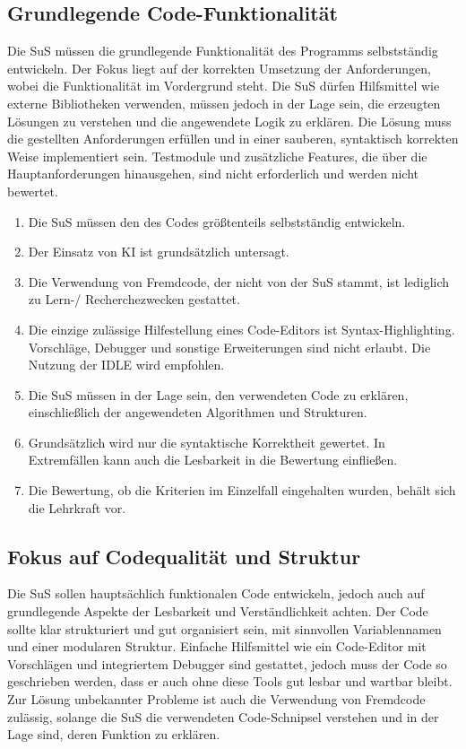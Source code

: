 \documentclass[a4paper,12pt]{article}
\begin{document}
\subsection{Grundlegende Code-Funktionalität}
Die SuS müssen die grundlegende Funktionalität des Programms selbstständig entwickeln. Der Fokus liegt auf der korrekten Umsetzung der Anforderungen, wobei die Funktionalität im Vordergrund steht. Die SuS dürfen Hilfsmittel wie externe Bibliotheken verwenden, müssen jedoch in der Lage sein, die erzeugten Lösungen zu verstehen und die angewendete Logik zu erklären. Die Lösung muss die gestellten Anforderungen erfüllen und in einer sauberen, syntaktisch korrekten Weise implementiert sein. Testmodule und zusätzliche Features, die über die Hauptanforderungen hinausgehen, sind nicht erforderlich und werden nicht bewertet.

\begin{enumerate}[label=\S\ \arabic*]
    \item Die SuS müssen den des Codes größtenteils selbstständig entwickeln.
    \item Der Einsatz von KI ist grundsätzlich untersagt.
    \item Die Verwendung von Fremdcode, der nicht von der SuS stammt, ist lediglich zu Lern-/ Recherchezwecken gestattet.
    \item Die einzige zulässige Hilfestellung eines Code-Editors ist Syntax-Highlighting. Vorschläge, Debugger und sonstige Erweiterungen sind nicht erlaubt. Die Nutzung der IDLE wird empfohlen.
    \item Die SuS müssen in der Lage sein, den verwendeten Code zu erklären, einschließlich der angewendeten Algorithmen und Strukturen.
    \item Grundsätzlich wird nur die syntaktische Korrektheit gewertet. In Extremfällen kann auch die Lesbarkeit in die Bewertung einfließen.
    \item Die Bewertung, ob die Kriterien im Einzelfall eingehalten wurden, behält sich die Lehrkraft vor.
\end{enumerate}


\subsection{Fokus auf Codequalität und Struktur}
Die SuS sollen hauptsächlich funktionalen Code entwickeln, jedoch auch auf grundlegende Aspekte der Lesbarkeit und Verständlichkeit achten. Der Code sollte klar strukturiert und gut organisiert sein, mit sinnvollen Variablennamen und einer modularen Struktur. Einfache Hilfsmittel wie ein Code-Editor mit Vorschlägen und integriertem Debugger sind gestattet, jedoch muss der Code so geschrieben werden, dass er auch ohne diese Tools gut lesbar und wartbar bleibt. Zur Lösung unbekannter Probleme ist auch die Verwendung von Fremdcode zulässig, solange die SuS die verwendeten Code-Schnipsel verstehen und in der Lage sind, deren Funktion zu erklären.
\end{document}
